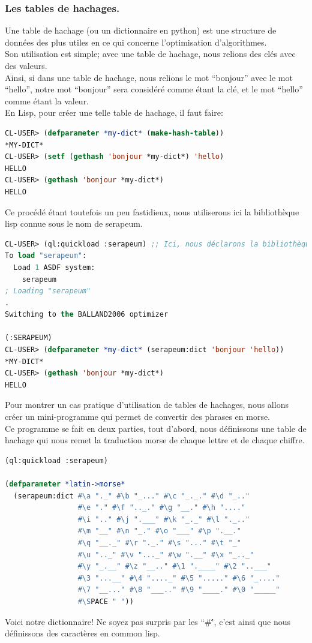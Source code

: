 \documentclass[a4paper, 12pt]{article}
\numberwithin{equation}{subsection}
\begin{document}
\subsubsection{Les tables de hachages.}
Une table de hachage (ou un dictionnaire en python) est une structure de données des plus utiles en ce qui concerne l'optimisation d'algorithmes. \\

Son utilisation est simple; avec une table de hachage, nous relions des clés avec des valeurs. \\

Ainsi, si dans une table de hachage, nous relions le mot ``bonjour'' avec le mot ``hello'', notre mot ``bonjour'' sera considéré comme étant la clé, et le mot ``hello'' comme étant la valeur. \\

En Lisp, pour créer une telle table de hachage, il faut faire: \\
\begin{lstlisting}[language=Lisp]
CL-USER> (defparameter *my-dict* (make-hash-table))
*MY-DICT*
CL-USER> (setf (gethash 'bonjour *my-dict*) 'hello)
HELLO
CL-USER> (gethash 'bonjour *my-dict*)
HELLO
\end{lstlisting}
Ce procédé étant toutefois un peu fastidieux, nous utiliserons ici la bibliothèque lisp connue sous le nom de serapeum. \\
\begin{lstlisting}[language=Lisp]
CL-USER> (ql:quickload :serapeum) ;; Ici, nous déclarons la bibliothèque.
To load "serapeum":
  Load 1 ASDF system:
    serapeum
; Loading "serapeum"
.
Switching to the BALLAND2006 optimizer

(:SERAPEUM)
CL-USER> (defparameter *my-dict* (serapeum:dict 'bonjour 'hello))
*MY-DICT*
CL-USER> (gethash 'bonjour *my-dict*)
HELLO
\end{lstlisting}
Pour montrer un cas pratique d'utilisation de tables de hachages, nous allons créer un mini-programme qui permet de convertir des phrases en morse. \\

Ce programme se fait en deux parties, tout d'abord, nous définissons une table de hachage qui nous remet la traduction morse de chaque lettre et de chaque chiffre. \\
\begin{lstlisting}[language=Lisp]
(ql:quickload :serapeum)

(defparameter *latin->morse*
  (serapeum:dict #\a "._" #\b "_..." #\c "_._." #\d "_.."
                 #\e "." #\f ".._." #\g "__." #\h "...."
                 #\i ".." #\j ".___" #\k "_._" #\l "._.."
                 #\m "__" #\n "_." #\o "___" #\p ".__."
                 #\q "__._" #\r "._." #\s "..." #\t "_"
                 #\u ".._" #\v "..._" #\w ".__" #\x "_.._"
                 #\y "_.__" #\z "__.." #\1 ".____" #\2 "..___"
                 #\3 "...__" #\4 "...._" #\5 "....." #\6 "_...."
                 #\7 "__..." #\8 "___.." #\9 "____." #\0 "_____"
                 #\SPACE " "))
\end{lstlisting}
Voici notre dictionnaire! Ne soyez pas surpris par les ``\#\'', c'est ainsi que nous définissons des caractères en common lisp. \\
\end{document}

